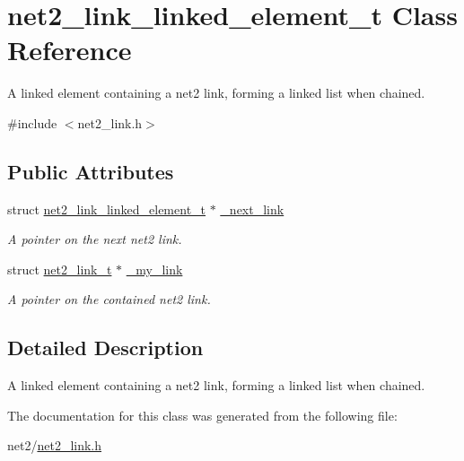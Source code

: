 \hypertarget{structnet2__link__linked__element__t}{\section{net2\-\_\-link\-\_\-linked\-\_\-element\-\_\-t Class Reference}
\label{structnet2__link__linked__element__t}
}


A linked element containing a net2 link, forming a linked list when chained.  




{\ttfamily \#include $<$net2\-\_\-link.\-h$>$}

\subsection*{Public Attributes}
\begin{DoxyCompactItemize}
\item 
\hypertarget{structnet2__link__linked__element__t_a167564acaf196fac9ae24b3192367b33}{struct \hyperlink{structnet2__link__linked__element__t}{net2\-\_\-link\-\_\-linked\-\_\-element\-\_\-t} $\ast$ \hyperlink{structnet2__link__linked__element__t_a167564acaf196fac9ae24b3192367b33}{\-\_\-next\-\_\-link}}\label{structnet2__link__linked__element__t_a167564acaf196fac9ae24b3192367b33}

\begin{DoxyCompactList}\small\item\em A pointer on the next net2 link. \end{DoxyCompactList}\item 
\hypertarget{structnet2__link__linked__element__t_a9259dac034e68a1681460c73581072b7}{struct \hyperlink{structnet2__link__t}{net2\-\_\-link\-\_\-t} $\ast$ \hyperlink{structnet2__link__linked__element__t_a9259dac034e68a1681460c73581072b7}{\-\_\-my\-\_\-link}}\label{structnet2__link__linked__element__t_a9259dac034e68a1681460c73581072b7}

\begin{DoxyCompactList}\small\item\em A pointer on the contained net2 link. \end{DoxyCompactList}\end{DoxyCompactItemize}


\subsection{Detailed Description}
A linked element containing a net2 link, forming a linked list when chained. 

The documentation for this class was generated from the following file\-:\begin{DoxyCompactItemize}
\item 
net2/\hyperlink{net2__link_8h}{net2\-\_\-link.\-h}\end{DoxyCompactItemize}
